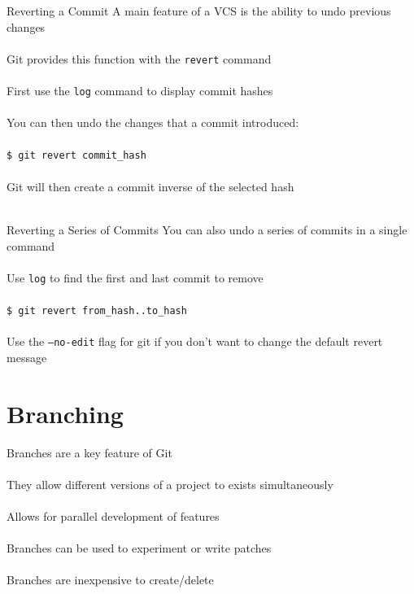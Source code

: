 \documentclass{beamer}
\begin{document}
\begin{frame}{Reverting a Commit}
    A main feature of a VCS is the ability to undo previous changes \\~\\

    Git provides this function with the {\tt revert} command \\~\\

    First use the {\tt log} command to display commit hashes \\~\\

    You can then undo the changes that a commit introduced: \\~\\
    
    {\tt \$ git revert commit\_hash} \\~\\

    Git will then create a commit inverse of the selected hash \\~\\
\end{frame}

\begin{frame}{Reverting a Series of Commits}
You can also undo a series  of commits in a single command \\~\\

Use {\tt log} to find the first and last commit to remove \\~\\

{\tt \$ git revert from\_hash..to\_hash} \\~\\

Use the {\tt --no-edit} flag for git if you don't want to change the default
revert message
\end{frame}

\section{Branching}
\begin{frame}{\secname}
    Branches are a key feature of Git \\~\\

    They allow different versions of a project to exists simultaneously \\~\\
    
    Allows for parallel development of features \\~\\

    Branches can be used to experiment or write patches \\~\\

    Branches are inexpensive to create/delete \\~\\
\end{frame}
\end{document}
